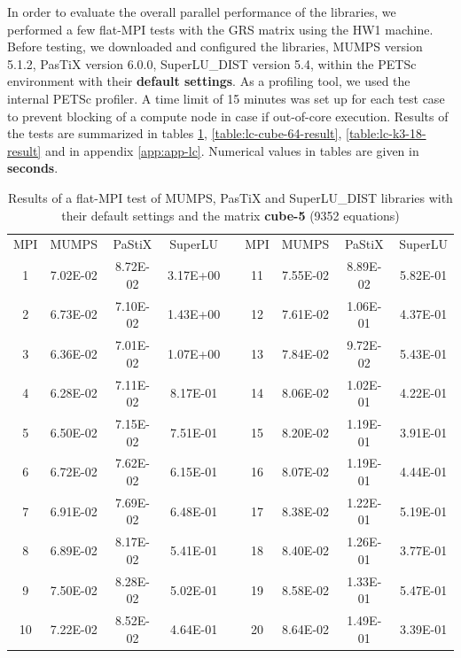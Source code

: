In order to evaluate the overall parallel performance of the libraries, we performed a few flat-MPI tests with the GRS matrix using the HW1 machine. Before testing, we downloaded and configured the libraries, MUMPS version 5.1.2, PasTiX version 6.0.0, SuperLU\_DIST version 5.4, within the PETSc environment with their \textbf{default settings}. As a profiling tool, we used the internal PETSc profiler. A time limit of 15 minutes was set up for each test case to prevent blocking of a compute node in case if out-of-core execution. Results of the tests are summarized in tables \ref{table:lc-cube-5-result}, \ref{table:lc-cube-64-result}, \ref{table:lc-k3-18-result} and in appendix \ref{app:app-lc}. Numerical values in tables are given in \textbf{seconds}.\\


\begin{table}[ht]
\centering
\begin{tabular}{|c|c|c|c|l|c|c|c|c|}
\cline{1-4} \cline{6-9}
MPI & MUMPS    & PaStiX   & SuperLU  &  & MPI & MUMPS    & PaStiX   & SuperLU  \\ \cline{1-4} \cline{6-9} 
1   & 7.02E-02 & 8.72E-02 & 3.17E+00 &  & 11  & 7.55E-02 & 8.89E-02 & 5.82E-01 \\ \cline{1-4} \cline{6-9} 
2   & 6.73E-02 & 7.10E-02 & 1.43E+00 &  & 12  & 7.61E-02 & 1.06E-01 & 4.37E-01 \\ \cline{1-4} \cline{6-9} 
3   & 6.36E-02 & 7.01E-02 & 1.07E+00 &  & 13  & 7.84E-02 & 9.72E-02 & 5.43E-01 \\ \cline{1-4} \cline{6-9} 
4   & 6.28E-02 & 7.11E-02 & 8.17E-01 &  & 14  & 8.06E-02 & 1.02E-01 & 4.22E-01 \\ \cline{1-4} \cline{6-9} 
5   & 6.50E-02 & 7.15E-02 & 7.51E-01 &  & 15  & 8.20E-02 & 1.19E-01 & 3.91E-01 \\ \cline{1-4} \cline{6-9} 
6   & 6.72E-02 & 7.62E-02 & 6.15E-01 &  & 16  & 8.07E-02 & 1.19E-01 & 4.44E-01 \\ \cline{1-4} \cline{6-9} 
7   & 6.91E-02 & 7.69E-02 & 6.48E-01 &  & 17  & 8.38E-02 & 1.22E-01 & 5.19E-01 \\ \cline{1-4} \cline{6-9} 
8   & 6.89E-02 & 8.17E-02 & 5.41E-01 &  & 18  & 8.40E-02 & 1.26E-01 & 3.77E-01 \\ \cline{1-4} \cline{6-9} 
9   & 7.50E-02 & 8.28E-02 & 5.02E-01 &  & 19  & 8.58E-02 & 1.33E-01 & 5.47E-01 \\ \cline{1-4} \cline{6-9} 
10  & 7.22E-02 & 8.52E-02 & 4.64E-01 &  & 20  & 8.64E-02 & 1.49E-01 & 3.39E-01 \\ \cline{1-4} \cline{6-9} 
\end{tabular}
\caption{Results of a flat-MPI test of MUMPS, PasTiX and SuperLU\_DIST libraries with their default settings and the matrix \textbf{cube-5} (9352 equations)}
\label{table:lc-cube-5-result}
\end{table}


